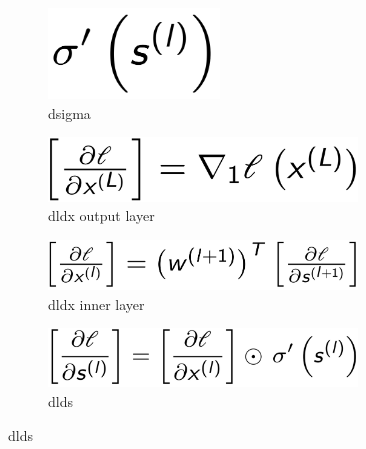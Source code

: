 \begin{figure}[H]
	\begin{minipage}{0.15\textwidth} 
		\begin{figure}[H]
			\includegraphics[width=0.5\textwidth]{Images/disgma.png}
			\centering
			\caption{dsigma}
			\centering
		\end{figure}
	\end{minipage} 
	\begin{minipage}{0.25\textwidth} 
		\begin{figure}[H]
			\includegraphics[width=0.9\textwidth]{Images/dldx_fin.png}
			\centering
			\caption{dldx output layer}
			\centering
		\end{figure}
	\end{minipage}
	\begin{minipage}{0.25\textwidth} 
		\begin{figure}[H]
			\includegraphics[width=0.9\textwidth]{Images/dldx_in.png}
			\centering
			\caption{dldx inner layer}
			\centering
		\end{figure}
	\end{minipage} 
	\begin{minipage}{0.25\textwidth} 
		\begin{figure}[H]
			\includegraphics[width=0.9\textwidth]{Images/dlds.png}
			\centering
			\caption{dlds}
			\centering
		\end{figure}
	\end{minipage}
	\centering
\end{figure}


